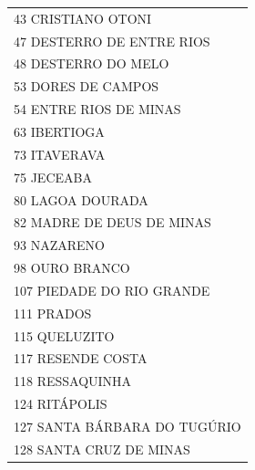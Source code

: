 \documentclass{article}
\begin{document}
\begin{longtable}[c]{m{18cm}}
\multicolumn{1}{l}{ \hspace{2em} 43 CRISTIANO OTONI } \\
\multicolumn{1}{l}{ \hspace{2em} 47 DESTERRO DE ENTRE RIOS } \\
\multicolumn{1}{l}{ \hspace{2em} 48 DESTERRO DO MELO } \\
\multicolumn{1}{l}{ \hspace{2em} 53 DORES DE CAMPOS } \\
\multicolumn{1}{l}{ \hspace{2em} 54 ENTRE RIOS DE MINAS } \\
\multicolumn{1}{l}{ \hspace{2em} 63 IBERTIOGA } \\
\multicolumn{1}{l}{ \hspace{2em} 73 ITAVERAVA } \\
\multicolumn{1}{l}{ \hspace{2em} 75 JECEABA } \\
\multicolumn{1}{l}{ \hspace{2em} 80 LAGOA DOURADA } \\
\multicolumn{1}{l}{ \hspace{2em} 82 MADRE DE DEUS DE MINAS } \\
\multicolumn{1}{l}{ \hspace{2em} 93 NAZARENO } \\
\multicolumn{1}{l}{ \hspace{2em} 98 OURO BRANCO } \\
\multicolumn{1}{l}{ \hspace{2em} 107 PIEDADE DO RIO GRANDE } \\
\multicolumn{1}{l}{ \hspace{2em} 111 PRADOS } \\
\multicolumn{1}{l}{ \hspace{2em} 115 QUELUZITO } \\
\multicolumn{1}{l}{ \hspace{2em} 117 RESENDE COSTA } \\
\multicolumn{1}{l}{ \hspace{2em} 118 RESSAQUINHA } \\
\multicolumn{1}{l}{ \hspace{2em} 124 RITÁPOLIS } \\
\multicolumn{1}{l}{ \hspace{2em} 127 SANTA BÁRBARA DO TUGÚRIO } \\
\multicolumn{1}{l}{ \hspace{2em} 128 SANTA CRUZ DE MINAS } \\

\end{longtable}
\end{document}

